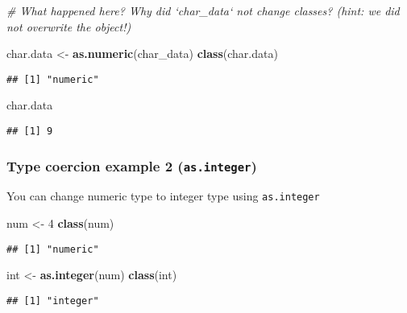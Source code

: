 \documentclass[]{article}
\newenvironment{Shaded}{\begin{snugshade}}{\end{snugshade}}
\newcommand{\KeywordTok}[1]{\textcolor[rgb]{0.13,0.29,0.53}{\textbf{#1}}}
\newcommand{\DecValTok}[1]{\textcolor[rgb]{0.00,0.00,0.81}{#1}}
\newcommand{\StringTok}[1]{\textcolor[rgb]{0.31,0.60,0.02}{#1}}
\newcommand{\CommentTok}[1]{\textcolor[rgb]{0.56,0.35,0.01}{\textit{#1}}}
\newcommand{\NormalTok}[1]{#1}
\begin{document}
\begin{Shaded}
\begin{Highlighting}[]
\CommentTok{# What happened here? Why did `char_data` not change classes? (hint: we did not overwrite the object!)}

\NormalTok{char.data <-}\StringTok{ }\KeywordTok{as.numeric}\NormalTok{(char_data)}
\KeywordTok{class}\NormalTok{(char.data)}
\end{Highlighting}
\end{Shaded}

\begin{verbatim}
## [1] "numeric"
\end{verbatim}

\begin{Shaded}
\begin{Highlighting}[]
\NormalTok{char.data}
\end{Highlighting}
\end{Shaded}

\begin{verbatim}
## [1] 9
\end{verbatim}

\subsubsection{\texorpdfstring{Type coercion example 2
(\texttt{as.integer})}{Type coercion example 2 (as.integer)}}\label{type-coercion-example-2-as.integer}

You can change numeric type to integer type using \texttt{as.integer}

\begin{Shaded}
\begin{Highlighting}[]
\NormalTok{num <-}\StringTok{ }\DecValTok{4}
\KeywordTok{class}\NormalTok{(num)}
\end{Highlighting}
\end{Shaded}

\begin{verbatim}
## [1] "numeric"
\end{verbatim}

\begin{Shaded}
\begin{Highlighting}[]
\NormalTok{int <-}\StringTok{ }\KeywordTok{as.integer}\NormalTok{(num)}
\KeywordTok{class}\NormalTok{(int)}
\end{Highlighting}
\end{Shaded}

\begin{verbatim}
## [1] "integer"
\end{verbatim}
\end{document}
